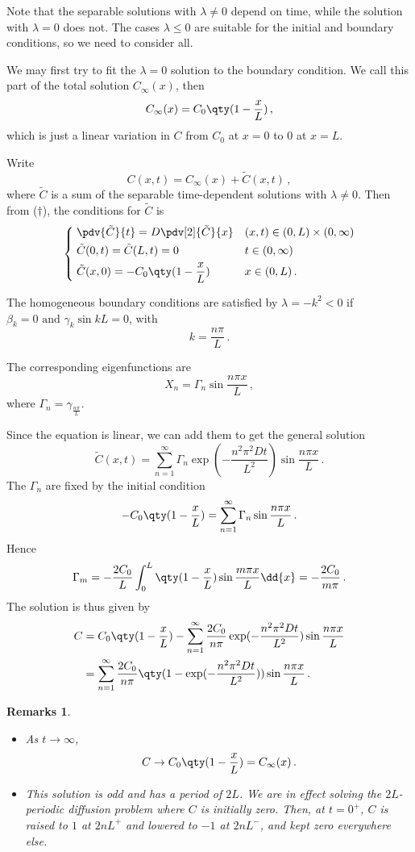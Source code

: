 \documentclass{article}
\theoremstyle{plain}\theoremheaderfont{\normalfont\itshape}\theorembodyfont{\rmfamily}\theoremseparator{.}\newtheorem*{rem}{Remark}\newtheorem*{ex}{Example}\newtheorem*{proof}{Proof}\newtheorem*{altp}{Alternative proof}
\theoremstyle{plain}\theoremheaderfont{\normalfont\bfseries}\theorembodyfont{\rmfamily}\theoremseparator{.}\newtheorem{thm}{Theorem}[section]\newtheorem{lem}[thm]{Lemma}\newtheorem{prop}[thm]{Proposition}\newtheorem*{cor}{Corollary}\newtheorem{defn}[thm]{Definition}\newtheorem{clm}[thm]{Claim}\newtheorem{clminproof}{Claim}
\theoremstyle{break}\theoremheaderfont{\normalfont\itshape}\theorembodyfont{\rmfamily}\theoremseparator{.\medskip}\newtheorem*{proofskip}{Proof}\newtheorem*{exs}{Examples}\newtheorem*{rems}{Remarks}
\theoremstyle{break}\theoremheaderfont{\normalfont\bfseries}\theorembodyfont{\rmfamily}\theoremseparator{.\medskip}\newtheorem{lemskip}[thm]{Lemma}\newtheorem{defnskip}[thm]{Definition}\newtheorem{propskip}[thm]{Proposition}\newtheorem{thmskip}[thm]{Theorem}
\numberwithin{equation}{section}
\begin{document}
	Note that the separable solutions with \(\lambda\ne 0\) depend on time, while the solution with \(\lambda=0\) does not. The cases \(\lambda\le 0\) are suitable for the initial and boundary conditions, so we need to consider all.
	
	We may first try to fit the \(\lambda=0\) solution to the boundary condition. We call this part of the total solution \(C_\infty(x)\), then
	\[C_\infty(x)=C_0\qty(1-\frac{x}{L})\,,\]
	which is just a linear variation in \(C\) from \(C_0\) at \(x=0\) to \(0\) at \(x=L\).
	
	Write
	\[C(x,t)=C_\infty(x)+\tilde{C}(x,t)\,,\]
	where \(\tilde{C}\) is a sum of the separable time-dependent solutions with \(\lambda\ne 0\). Then from (\(\dagger\)), the conditions for \(\tilde{C}\) is
	\[\left\{\begin{aligned}
			& \;\pdv{\tilde{C}}{t}=D\pdv[2]{\tilde{C}}{x} && (x,t)\in(0,L)\times(0,\infty)\\
			& \;\tilde{C}(0,t)=\tilde{C}(L,t)=0 && t\in(0,\infty)\\
			& \;\tilde{C}(x,0)=-C_0\qty(1-\frac{x}{L}) && x\in(0,L)\,.
		\end{aligned}\right.\]
	
	The homogeneous boundary conditions are satisfied by \(\lambda=-k^2<0\) if \(\beta_k=0\text{ and }\gamma_k\sin kL=0\), with
	\[k=\frac{n\pi}{L}\,.\]
	
	The corresponding eigenfunctions are
	\[X_n=\Gamma_n\sin\frac{n\pi x}{L}\,,\]
	where \(\Gamma_n=\gamma_{\frac{n\pi}{L}}\).
	
	Since the equation is linear, we can add them to get the general solution
	\[\tilde{C}(x,t)=\sum_{n=1}^{\infty}\Gamma_n\exp(-\frac{n^2\pi^2 Dt}{L^2})\sin\frac{n\pi x}{L}\,.\]
	The \(\Gamma_n\) are fixed by the initial condition
	\[-C_0\qty(1-\frac{x}{L})=\sum_{n=1}^{\infty}\Gamma_n\sin\frac{n\pi x}{L}\,.\]
	Hence
	\[\Gamma_m=-\frac{2C_0}{L}\int_{0}^{L}\qty(1-\frac{x}{L})\sin\frac{m\pi x}{L}\dd{x}=-\frac{2C_0}{m\pi}\,.\]
	The solution is thus given by
	\begin{align*}
		C&=C_0\qty(1-\frac{x}{L})-\sum_{n=1}^{\infty}\frac{2C_0}{n\pi}\exp(-\frac{n^2\pi^2Dt}{L^2})\sin\frac{n\pi x}{L}\\
		&=\sum_{n=1}^{\infty}\frac{2C_0}{n\pi}\qty(1-\exp(-\frac{n^2\pi^2Dt}{L^2}))\sin\frac{n\pi x}{L}\,.
	\end{align*}

	\begin{rems}
		\begin{itemize}[topsep=0pt]
			\item As \(t\to\infty\),
			\[C\to C_0\qty(1-\frac{x}{L})=C_\infty(x)\,.\]
			\item This solution is odd and has a period of \(2L\). We are in effect solving the \(2L\)-periodic diffusion problem where \(C\) is initially zero. Then, at \(t=0^+\), \(C\) is raised to \(1\) at \(2nL^+\) and lowered to \(-1\) at \(2nL^-\), and kept zero everywhere else.
		\end{itemize}
	\end{rems}
	
\end{document}
